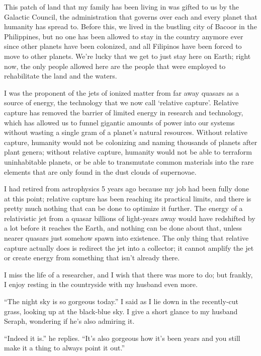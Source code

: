 \documentclass{book}
\begin{document}
			This patch of land that my family has been living in was gifted to us by the Galactic
			Council, the administration that governs over each and every planet that humanity has
			spread to. Before this, we lived in the bustling city of Bacoor in the Philippines, but
			no one has been allowed to stay in the country anymore ever since other planets have been
			colonized, and all Filipinos have been forced to move to other planets. We're lucky that we
			get to just stay here on Earth; right now, the only people allowed here are the people
			that were employed to rehabilitate the land and the waters.

			I was the proponent of the jets of ionized matter from far away quasars as
			a source of energy, the technology that we now call `relative capture'. Relative
			capture has removed the barrier of limited energy in research and technology, which has
			allowed us to funnel gigantic amounts of power into our systems without wasting a single
			gram of a planet's natural resources. Without relative capture, humanity would not be
			colonizing and naming thousands of planets after plant genera; without relative
			capture, humanity would not be able to terraform uninhabitable planets, or be able to
			transmutate common materials into the rare elements that are only found in the dust clouds of
			supernovae.

			I had retired from astrophysics 5 years ago because my job had been fully done at this
			point; relative capture has been reaching its practical limits, and there is pretty
			much nothing that can be done to optimize it further. The energy of a relativistic jet
			from a quasar billions of light-years away would have redshifted by a lot before it
			reaches the Earth, and nothing can be done about that, unless nearer quasars just somehow
			spawn into existence. The only thing that relative capture actually does is redirect the
			jet into a collector; it cannot amplify the jet or create energy from something that
			isn't already there.

			I miss the life of a researcher, and I wish that there was more to do; but frankly, I
			enjoy resting in the countryside with my husband even more.

			``The night sky is so gorgeous today.'' I said as I lie down in the recently-cut grass,
			looking up at the black-blue sky. I give a short glance to my husband Seraph, wondering
			if he's also admiring it.

			``Indeed it is.'' he replies. ``It's also gorgeous how it's been years and you still
			make it a thing to always point it out.''
\end{document}
